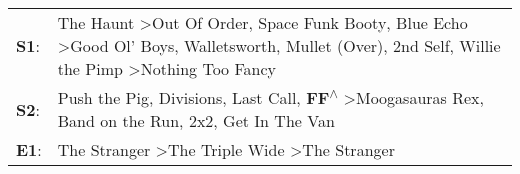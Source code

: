 \begin{supertabular}{p{0.03\textwidth}p{0.92\textwidth}}
 \textbf{S1}:  &  The Haunt\textsuperscript{} \textgreater \enspace Out Of Order\textsuperscript{}, \enspace Space Funk Booty\textsuperscript{}, \enspace Blue Echo\textsuperscript{} \textgreater \enspace Good Ol' Boys\textsuperscript{}, \enspace Walletsworth\textsuperscript{}, \enspace Mullet (Over)\textsuperscript{}, \enspace 2nd Self\textsuperscript{}, \enspace Willie the Pimp\textsuperscript{} \textgreater \enspace Nothing Too Fancy\textsuperscript{}  \enspace  \\
 \textbf{S2}:  &                                                                                                                Push the Pig\textsuperscript{}, \enspace Divisions\textsuperscript{}, \enspace Last Call\textsuperscript{}, \enspace \textbf{FF\textsuperscript{$\wedge$}} \textgreater \enspace Moogasauras Rex\textsuperscript{}, \enspace Band on the Run\textsuperscript{}, \enspace 2x2\textsuperscript{}, \enspace Get In The Van\textsuperscript{}  \enspace  \\
 \textbf{E1}:  &                                                                                                                                                                                                                                                                                                              The Stranger\textsuperscript{} \textgreater \enspace The Triple Wide\textsuperscript{} \textgreater \enspace The Stranger\textsuperscript{}  \enspace  \\
\end{supertabular}
